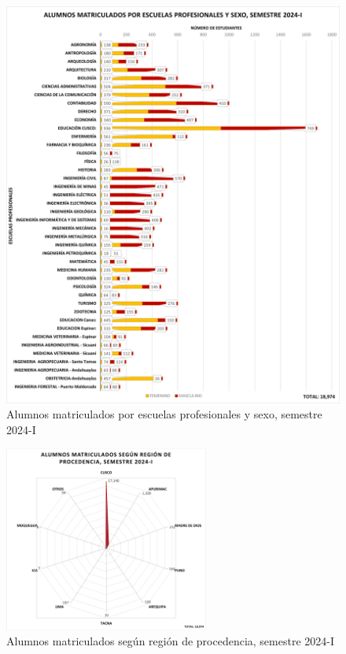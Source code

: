 \documentclass[
  12pt,
  letterpaper,
]{scrreprt}
\begin{document}
\begin{figure}[H]

\caption{Alumnos matriculados por escuelas profesionales y sexo,
semestre 2024-I}

{\centering \includegraphics{imagen/imagen1.png}

}

\end{figure}%
\begin{figure}[H]

\caption{Alumnos matriculados según región de procedencia, semestre
2024-I}

{\centering \includegraphics[width=0.6\textwidth,height=\textheight]{imagen/imagen6.png}

}

\end{figure}%
\end{document}
